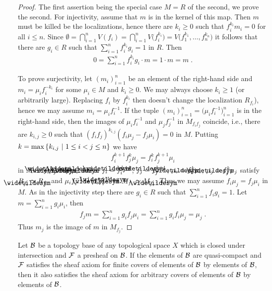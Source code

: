 \documentclass[a4paper,parskip=half,numbers=enddot, DIV=12]{scrreprt}
\begin{document}
\begin{proof}
    The first assertion being the special case $M=R$ of the second, we prove the second. For injectivity, assume that $m$ is in the kernel of this map. Then $m$ must be killed be the localizations, hence there are $k_i\geq0$ such that $f^{k_i}_i m_i = 0$ for all $i\leq n$. Since $\emptyset = \bigcap_{i=1}^n V(f_i) = \bigcap_{i=1}^n V\big(f^{k_i}_i\big) = V\big(f_1^{k_1},\ldots, f_n^{k_n}\big)$ it follows that there are $g_i\in R$ such that $\sum_{i=1}^n f_i^{k_i}g_i = 1$ in $R$. Then 
    \begin{align*}
    	0=\sum_{i=1}^{n}f_i^{k_i}g_i\cdot m=1\cdot m=m\;.
    \end{align*}
    
	    To prove surjectivity, let $(m_i)_{i=1}^n$ be an element of the right-hand side and $m_i=\mu_if_i^{-k_i}$ for some $\mu_i\in M$ and $k_i\geq0$. We may always choose $k_i\geq1$ (or arbitrarily large). Replacing $f_i$ by $f_i^{k_i}$ then doesn't change the localization $R_{f_i}$), hence we may assume $m_i = \mu_if_i^{-1}$. If the tuple $(m_i)_{i=1}^n=\big(\mu_if_i^{-1}\big)_{i=1}^n$ is in the right-hand side, then the images of $\mu_if_i^{-1}$ and $\mu_jf_j^{-1}$ in $M_{f_if_j}$ coincide, i.e., there are $k_{i,j}\geq 0$ such that $(f_if_j)^{k_{i,j}}(f_i\mu_j - f_j\mu_i) = 0$ in $M$. Putting $k= \max\left\{ k_{i,j}\ \middle|\  1\leq i <j\leq n\right\}$ we have 
    \begin{align*}
        f_i^{k+1}f_j^k\mu_j = f_i^k f_j^{k+1}\mu_i
    \end{align*}
    in $M$ or $\snake f_i\snake \mu_j = \snake f_j \snake \mu_i$ where $\snake f_i = f_i^{k+1}$, $\snake f_j = f_j^{k+1}$, $\snake \mu_i = f_i^k\mu_i$, $\snake \mu_j = f_j^k\mu_j$ satisfy $R_{\snake f_i} \simeq R_{f_i}$ and $\mu_if_i^{-1} = \smash{\snake \mu_i\snake f_i^{-1}}$ in $M_{f_i} \simeq M_{\snake f_i}$. Thus we may assume $f_i\mu_j = f_j\mu_i$ in $M$. As in the injectivity step there are $g_i\in R$ such that $\sum_{i=1}^n f_i g_i = 1$. Let $m = \sum_{i=1}^n g_i\mu_i$, then 
    \begin{align*}
    	f_jm = \sum_{i=1}^n g_if_j\mu_i = \sum_{i=1}^n g_i f_i\mu_j = \mu_j\;. 
    \end{align*}
    Thus $m_j$ is the image of $m$ in $M_{f_j}$.
\end{proof}
\begin{lem}
    Let $\mathcal{B}$ be a topology base of any topological space $X$ which is closed under intersection and $\mathcal{F}$ a presheaf on $\mathcal{B}$. If the elements of $\mathcal{B}$ are quasi-compact and $\mathcal{F}$ satisfies the sheaf axiom for finite covers of elements of $\mathcal{B}$ by elements of $\mathcal{B}$, then it also satisfies the sheaf axiom for arbitrary covers of elements of $\mathcal{B}$ by elements of $\mathcal{B}$.
\end{lem}
\end{document}

